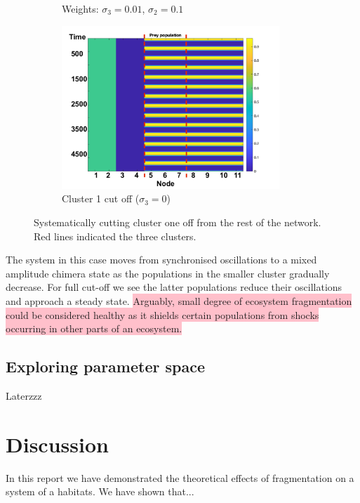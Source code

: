 \documentclass[12pt]{article}
\begin{document}
\begin{figure}[H]
\begin{subfigure}[b]{0.4\textwidth}
     \caption{Weights: $\sigma_3 = 0.01$, $\sigma_2 = 0.1$}
 \end{subfigure}
 \begin{subfigure}[b]{0.4\textwidth}
     \centering
     \includegraphics[width=0.9\textwidth]{Claire Section/cutoff.png}
     \caption{Cluster 1 cut off ($\sigma_3 = 0$)}
 \end{subfigure}
 \caption{Systematically cutting cluster one off from the rest of the network. Red lines indicated the three clusters.}
\end{figure}
The system in this case moves from synchronised oscillations to a mixed amplitude chimera state as the populations in the smaller cluster gradually decrease. For full cut-off we see the latter populations reduce their oscillations and approach a steady state. \colorbox{pink}{Arguably, small degree of ecosystem fragmentation could be considered healthy as it shields certain populations from shocks occurring in other parts of an ecosystem.}
\subsection{Exploring parameter space}
Laterzzz
\section{Discussion}\label{section:discussion}
In this report we have demonstrated the theoretical effects of fragmentation on a system of a habitats. We have shown that...


\printbibliography

\appendix
\end{document}
